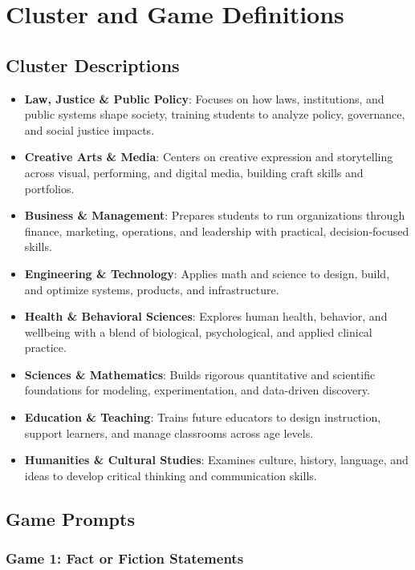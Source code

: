 
\chapter{Cluster and Game Definitions}

\section{Cluster Descriptions}
\label{app:clusters}

\begin{itemize}
    \item \textbf{Law, Justice \& Public Policy}: Focuses on how laws, institutions, and public systems shape society, training students to analyze policy, governance, and social justice impacts.
    \item \textbf{Creative Arts \& Media}: Centers on creative expression and storytelling across visual, performing, and digital media, building craft skills and portfolios.
    \item \textbf{Business \& Management}: Prepares students to run organizations through finance, marketing, operations, and leadership with practical, decision-focused skills.
    \item \textbf{Engineering \& Technology}: Applies math and science to design, build, and optimize systems, products, and infrastructure.
    \item \textbf{Health \& Behavioral Sciences}: Explores human health, behavior, and wellbeing with a blend of biological, psychological, and applied clinical practice.
    \item \textbf{Sciences \& Mathematics}: Builds rigorous quantitative and scientific foundations for modeling, experimentation, and data-driven discovery.
    \item \textbf{Education \& Teaching}: Trains future educators to design instruction, support learners, and manage classrooms across age levels.
    \item \textbf{Humanities \& Cultural Studies}: Examines culture, history, language, and ideas to develop critical thinking and communication skills.
\end{itemize}

\section{Game Prompts}
\label{app:games}

\subsection{Game 1: Fact or Fiction Statements}

